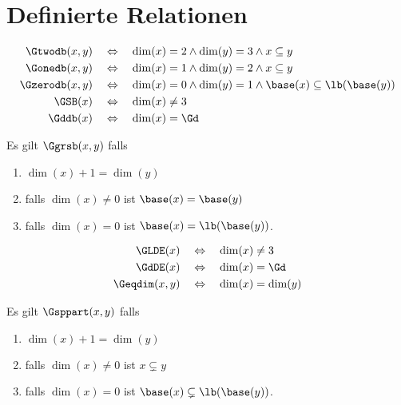 \section{Definierte Relationen}

\begin{satz}
    \begin{align*}
        \Gtwodb(x,y) \quad &\Leftrightarrow \quad \dim(x) = 2 \land \dim(y) = 3 \land x \subseteq y \\
        \Gonedb(x,y) \quad &\Leftrightarrow \quad \dim(x) = 1 \land \dim(y) = 2 \land x \subseteq y \\
        \Gzerodb(x,y) \quad &\Leftrightarrow \quad \dim(x) = 0 \land \dim(y) = 1 \land \base(x) \subseteq \lb(\base(y)) \\
        \GSB(x) \quad &\Leftrightarrow \quad \dim(x) \neq 3 \\
        \Gddb(x) \quad &\Leftrightarrow \quad \dim(x) = \Gd
    \end{align*}
\end{satz}

\begin{satz}
    Es gilt $\Ggrsb(x,y)$ falls
    \begin{enumerate}
        \item $\dim(x)+1 = \dim(y)$
        \item falls $\dim(x) \neq 0$ ist $\base(x) = \base(y)$
        \item falls $\dim(x) = 0$ ist $\base(x) = \lb(\base(y))$.
    \end{enumerate}
\end{satz}

\begin{satz}
    \begin{align*}
        \GLDE(x) \quad &\Leftrightarrow \quad \dim(x) \neq 3 \\
        \GdDE(x) \quad &\Leftrightarrow \quad \dim(x) = \Gd \\
        \Geqdim(x,y) \quad &\Leftrightarrow \quad \dim(x) = \dim(y)
    \end{align*}
\end{satz}

\begin{satz}
    Es gilt $\Gsppart(x,y)$ falls
    \begin{enumerate}
        \item $\dim(x)+1 = \dim(y)$
        \item falls $\dim(x) \neq 0$ ist $x \subsetneq y$
        \item falls $\dim(x) = 0$ ist $\base(x) \subsetneq \lb(\base(y))$.
    \end{enumerate}
\end{satz}

